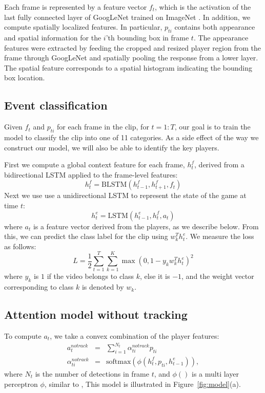 Each frame  is represented by a feature vector $f_t$, which is the activation of the last fully connected layer of
GoogLeNet \cite{} trained on ImageNet \cite{}.  
In addition, we compute spatially localized features.
In particular, $p_{ti}$ 
contains both appearance and spatial information for the $i$'th
bounding box in frame $t$. The appearance features were
extracted by feeding the cropped and resized player region from the frame
through GoogLeNet and spatially pooling the response from a lower layer. The
spatial feature corresponds to a spatial histogram indicating the bounding box
location.  



\subsection{Event classification}

Given $f_t$ and $p_{ti}$ for each frame in the clip, for $t=1:T$, our goal is to
train the model to classify the clip into one of 11 categories. As a
side effect of the way we construct our model, we will also be able to
identify the key players.

First we compute a global context feature for each frame, $h_t^f$, derived 
from a bidirectional LSTM applied to the
frame-level features:
\[
h_t^f = \mbox{BLSTM}(h_{t-1}^f, h_{t+1}^f, f_t)
\]
Next we use use a unidirectional LSTM to represent the state of the
game at time $t$:
\[
h_t^e = \mbox{LSTM}(h_{t-1}^e, h_t^f, a_t)
\]
where $a_t$ is a feature vector derived from the players, as we
describe below.
From this, we can predict the class label for the clip using $w_k^T
h_t^e$. We measure the loss as follows:
\begin{equation}
  L =   \frac{1}{2} \sum_{t=1}^T \sum_{k = 1}^K \max (0, 1 - y_k w_k^T h^e_t)^2
\end{equation} 
where $y_k$ is $1$ if the video belongs to class $k$,
else it is $-1$, and the weight vector corresponding to
class $k$ is denoted by $w_k$.

\subsection{Attention model without tracking}

To compute $a_t$, we take a convex combination of the player features:
\begin{eqnarray} 
\label{eq:notrack}
  a_t^{notrack} & = & \sum_{i=1}^{N_t} \alpha_{ti}^{notrack} p_{ti} 
\\ \nonumber
  \alpha_{ti}^{notrack} & = & \text{softmax} \left(\phi\left(h^f_t, p_{ti}, h^e_{t-1}\right)\right),
\end{eqnarray}
where $N_t$ is the number of detections in frame $t$, 
and $\phi()$ is a 
multi layer perceptron $\phi$, similar to
\cite{Bahdnau_arxiv14},
This model is illustrated in Figure~\ref{fig:model}(a).




